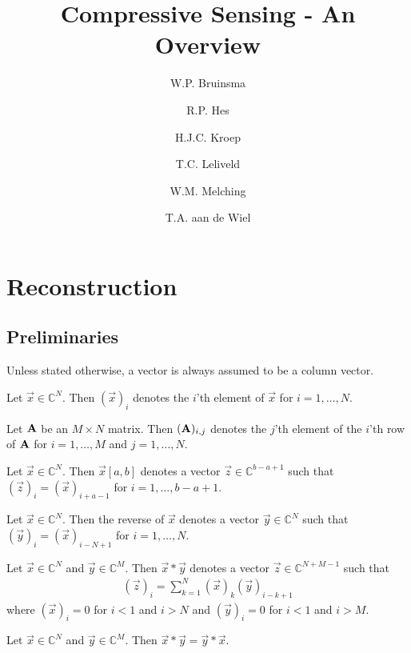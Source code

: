 \documentclass[a4paper, openany, oneside]{memoir}
\title{Compressive Sensing - An Overview}
\author{W.P. Bruinsma \and R.P. Hes \and H.J.C. Kroep \and T.C. Leliveld \and W.M. Melching \and T.A. aan de Wiel}
\begin{document}
\chapter{Reconstruction}

\section{Preliminaries}
Unless stated otherwise, a vector is always assumed to be a column vector.

\begin{blockDefinition}
    Let $\vec{x} \in \mathbb{C}^N$. Then $(\vec{x})_i$ denotes the $i$'th element of $\vec{x}$ for $i = 1,\ldots,N$.
\end{blockDefinition}

\begin{blockDefinition}
    Let $\boldsymbol{\mathbf{A}}$ be an $M \times N$ matrix. Then $(\boldsymbol{\mathbf{A}})_{i,j}$ denotes the $j$'th element of the $i$'th row of $\boldsymbol{\mathbf{A}}$ for $i = 1,\ldots,M$ and $j=1,\ldots,N$.
\end{blockDefinition}

\begin{blockDefinition}[Subvector]
    Let $\vec{x} \in \mathbb{C}^N$. Then $\vec{x}[a,b]$ denotes a vector $\vec{z} \in \mathbb{C}^{b-a+1}$ such that $(\vec{z})_i = (\vec{x})_{i+a-1}$ for $i = 1,\ldots,b-a+1$.
\end{blockDefinition}

\begin{blockDefinition}
    Let $\vec{x} \in \mathbb{C}^N$. Then the reverse of $\vec{x}$ denotes a vector $\vec{y} \in \mathbb{C}^N$ such that $(\vec{y})_i = (\vec{x})_{i-N+1}$ for $i = 1,\ldots,N$.
\end{blockDefinition}

\begin{blockDefinition}[Convolution]
    Let $\vec{x} \in \mathbb{C}^N$ and $\vec{y} \in \mathbb{C}^M$. Then $\vec{x} \ast \vec{y}$ denotes a vector $\vec{z} \in \mathbb{C}^{N+M-1}$ such that
    \begin{align*}
        (\vec{z})_i = \sum_{k=1}^{N} (\vec{x})_k (\vec{y})_{i-k+1}
    \end{align*}
    where $(\vec{x})_i=0$ for $i < 1$ and $i > N$ and $(\vec{y})_i=0$ for $i < 1$ and $i > M$.
\end{blockDefinition}

\begin{blockTheorem} \label{th:conv-comm}
    Let $\vec{x} \in \mathbb{C}^N$ and $\vec{y} \in \mathbb{C}^M$. Then $\vec{x} \ast \vec{y} = \vec{y} \ast \vec{x}$.
\end{blockTheorem}
\end{document}
